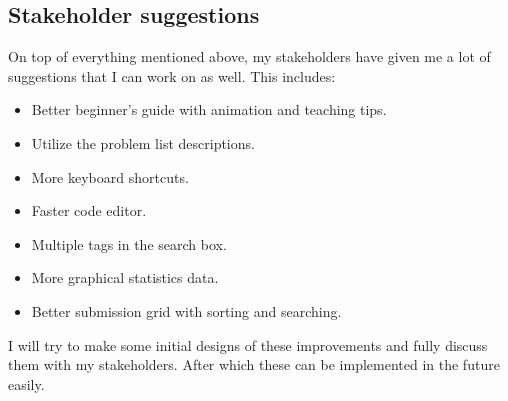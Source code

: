 \documentclass[report.tex]{subfiles}
\begin{document}
\subsection{Stakeholder suggestions}

On top of everything mentioned above, my stakeholders have given me a lot of suggestions that I can work on as well. This includes:

\begin{itemize}
  \item Better beginner's guide with animation and teaching tips.
  \item Utilize the problem list descriptions.
  \item More keyboard shortcuts.
  \item Faster code editor.
  \item Multiple tags in the search box.
  \item More graphical statistics data.
  \item Better submission grid with sorting and searching.
\end{itemize}

I will try to make some initial designs of these improvements and fully discuss them with my stakeholders. After which these can be implemented in the future easily.
\end{document}
